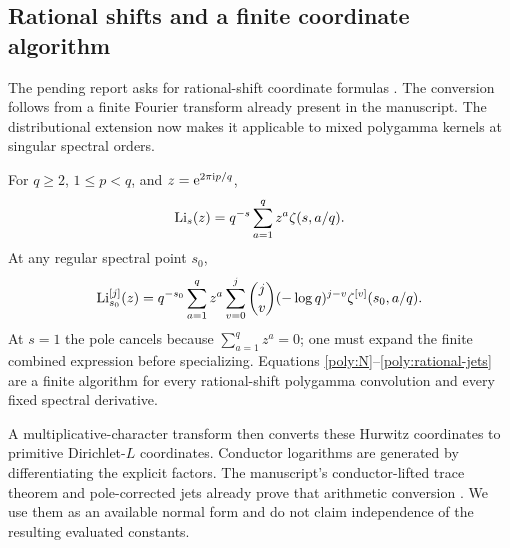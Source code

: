 \subsection{Rational shifts and a finite coordinate algorithm}

The pending report asks for rational-shift coordinate formulas
\cite{RepoIncoming}. The conversion follows from a finite Fourier
transform already present in the manuscript. The distributional
extension now makes it applicable to mixed polygamma kernels at
singular spectral orders.

For \(q\geq2\), \(1\leq p<q\), and \(z=\mathrm e^{2\pi\mathrm i p/q}\),
\begin{equation}\label{poly:rational}
 \operatorname{Li}_s(z)=q^{-s}\sum_{a=1}^q z^a\zeta(s,a/q).
\end{equation}
At any regular spectral point \(s_0\),
\begin{equation}\label{poly:rational-jets}
 \operatorname{Li}_{s_0}^{[j]}(z)
 =q^{-s_0}\sum_{a=1}^q z^a
   \sum_{v=0}^j\binom jv(-\log q)^{j-v}
             \zeta^{[v]}(s_0,a/q).
\end{equation}
At \(s=1\) the pole cancels because \(\sum_{a=1}^qz^a=0\);
one must expand the finite combined expression before specializing.
Equations \eqref{poly:N}--\eqref{poly:rational-jets}
are a finite algorithm for every rational-shift polygamma
convolution and every fixed spectral derivative.

A multiplicative-character transform then converts these Hurwitz
coordinates to primitive Dirichlet-\(L\) coordinates. Conductor
logarithms are generated by differentiating the explicit factors.
The manuscript's conductor-lifted trace theorem and pole-corrected
jets already prove that arithmetic conversion \cite{RepoManuscript}.
We use them as an available normal form and do not claim
independence of the resulting evaluated constants.

